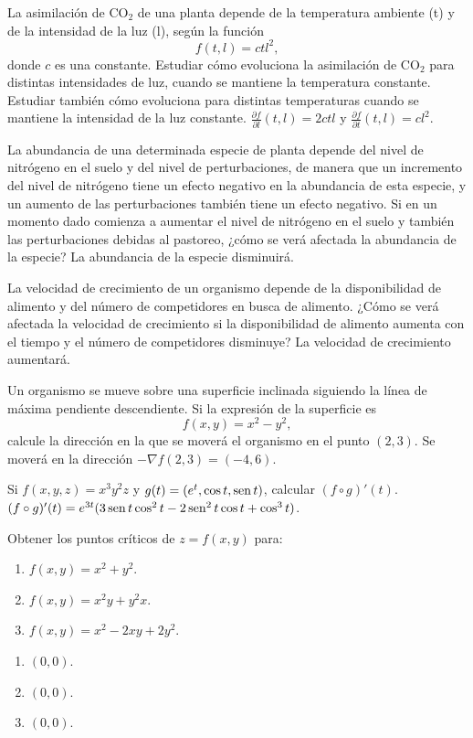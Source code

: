 {La asimilación de CO$_2$ de una planta depende de la temperatura ambiente (t) y de la intensidad de la luz (l), según la función 
\[
f(t,l) = ctl^2,
\]
donde $c$ es una constante. 
Estudiar cómo evoluciona la asimilación de CO$_2$ para distintas intensidades de luz, cuando se mantiene la temperatura constante. 
Estudiar también cómo evoluciona para distintas temperaturas cuando se mantiene la intensidad de la luz constante.   
}
{$\frac{\partial f}{\partial l}(t,l) = 2ctl$ y $\frac{\partial f}{\partial t}(t,l) = cl^2$.
}
{
}


{La abundancia de una determinada especie de planta depende del nivel de nitrógeno en el suelo y del nivel de perturbaciones, de manera que un incremento del nivel de nitrógeno tiene un efecto negativo en la abundancia de esta especie, y un aumento de las perturbaciones también tiene un efecto negativo.
Si en un momento dado comienza a aumentar el nivel de nitrógeno en el suelo y también las perturbaciones debidas al pastoreo, ¿cómo se verá afectada la abundancia de la especie?
}
{La abundancia de la especie disminuirá.
}
{
}


{La velocidad de crecimiento de un organismo depende de la disponibilidad de alimento y del número de competidores en busca de alimento. 
¿Cómo se verá afectada la velocidad de crecimiento si la disponibilidad de alimento aumenta con el tiempo y el número de competidores disminuye?}
{La velocidad de crecimiento aumentará. 
}
{
}


{Un organismo se mueve sobre una superficie inclinada siguiendo la línea de máxima pendiente descendiente. 
Si la expresión de la superficie es 
\[
f(x,y) = x^2-y^2,
\]
calcule la dirección en la que se moverá el organismo en el punto $(2,3)$.
}
{Se moverá en la dirección $-\nabla f(2,3)=(-4,6)$.}
{
}


{Si $f(x,y,z)=x^3y^2z$ y $g(t)=(e^t,\cos t,\operatorname{sen} t)$, calcular $(f\circ g)'(t)$.
}
{$(f\circ g)'(t)= e^{3t}(3\operatorname{sen} t\cos^2 t-2\operatorname{sen}^2 t\cos t+\cos^3 t)$.
}
{
}


{Obtener los puntos críticos de $z=f(x,y)$ para:
\begin{enumerate}
\item $f(x,y)=x^2+y^2$.
\item $f(x,y)=x^2y+y^2x$.
\item $f(x,y)=x^2-2xy+2y^2$.
\end{enumerate}
}
{\begin{enumerate}
\item $(0,0)$.
\item $(0,0)$.
\item $(0,0)$.
\end{enumerate}
}
{
}


